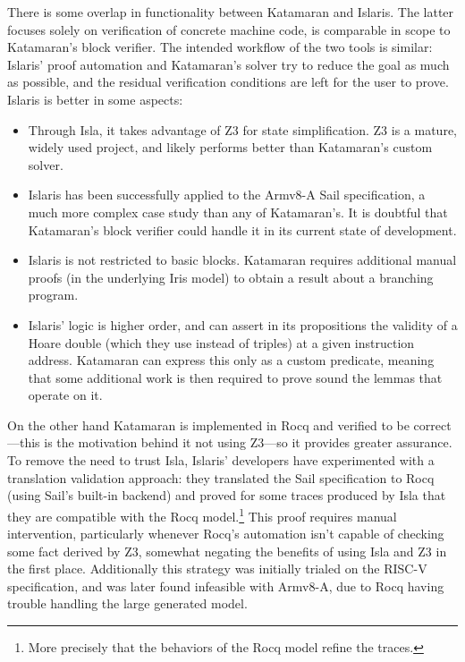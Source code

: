 There is some overlap in functionality between Katamaran and Islaris. The latter focuses solely on verification of concrete machine code, \ie is comparable in scope to Katamaran's block verifier. The intended workflow of the two tools is similar: Islaris' proof automation and Katamaran's solver try to reduce the goal as much as possible, and the residual verification conditions are left for the user to prove. Islaris is better in some aspects:
\begin{itemize}
\item Through Isla, it takes advantage of Z3 for state simplification. Z3 is a mature, widely used project, and likely performs better than Katamaran's custom solver.
\item Islaris has been successfully applied to the Armv8-A Sail specification, a much more complex case study than any of Katamaran's. It is doubtful that Katamaran's block verifier could handle it in its current state of development.
\item Islaris is not restricted to basic blocks. Katamaran requires additional manual proofs (in the underlying Iris model) to obtain a result about a branching program.
\item Islaris' logic is higher order, and can assert in its propositions the validity of a Hoare double (which they use instead of triples) at a given instruction address. Katamaran can express this only as a custom predicate, meaning that some additional work is then required to prove sound the lemmas that operate on it.
\end{itemize}

On the other hand Katamaran is implemented in Rocq and verified to be correct---this is the motivation behind it not using Z3---so it provides greater assurance. To remove the need to trust Isla, Islaris' developers have experimented with a translation validation approach: they translated the Sail specification to Rocq (using Sail's built-in backend) and proved for some traces produced by Isla that they are compatible with the Rocq model.\footnote{More precisely that the behaviors of the Rocq model refine the traces.} This proof requires manual intervention, particularly whenever Rocq's automation isn't capable of checking some fact derived by Z3, somewhat negating the benefits of using Isla and Z3 in the first place. Additionally this strategy was initially trialed on the RISC-V specification, and was later found infeasible with Armv8-A, due to Rocq having trouble handling the large generated model.

